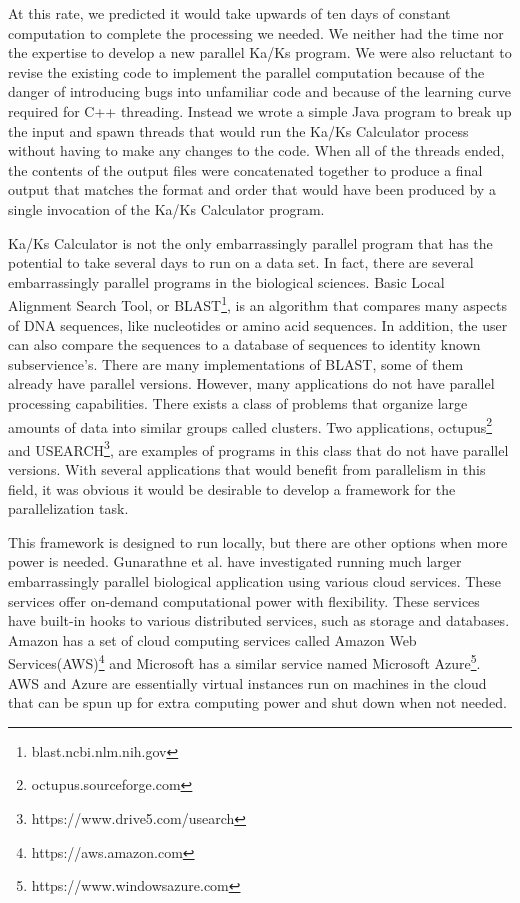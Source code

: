 \documentclass[12pt]{article}
\begin{document}
At this rate, we predicted it would take upwards of ten days of constant
computation to complete the processing we needed. We neither had the time nor
the expertise to develop a new parallel Ka/Ks program. We were also reluctant to
revise the existing code to implement the parallel computation because of the
danger of introducing bugs into unfamiliar code and because of the learning
curve required for C++ threading. Instead we wrote a simple Java program to
break up the input and spawn threads that would run the Ka/Ks Calculator process
without having to make any changes to the code. When all of the threads ended,
the contents of the output files were concatenated together to produce a final
output that matches the format and order that would have been produced by a
single invocation of the Ka/Ks Calculator program.

Ka/Ks Calculator is not the only embarrassingly parallel program that has the
potential to take several days to run on a data set. In fact, there are several
embarrassingly parallel programs in the biological sciences. Basic Local
Alignment Search Tool, or BLAST\footnote{blast.ncbi.nlm.nih.gov}, is an
algorithm that compares many aspects of DNA sequences, like nucleotides or amino
acid sequences. In addition, the user can also compare the sequences to a
database of sequences to identity known subservience's. There are many
implementations of BLAST, some of them already have parallel versions.  However,
many applications do not have parallel processing capabilities. There exists a
class of problems that organize large amounts of data into similar groups called
clusters. Two applications, octupus\footnote{octupus.sourceforge.com} and
USEARCH\footnote{https://www.drive5.com/usearch}, are examples of programs in
this class that do not have parallel versions. With several applications that
would benefit from parallelism in this field, it was obvious it would be
desirable to develop a framework for the parallelization task.

This framework is designed to run locally, but there are other options when more
power is needed. Gunarathne et al.\cite{cloud} have investigated running much
larger embarrassingly parallel biological application using various cloud
services. These services offer on-demand computational power with flexibility.
These services have built-in hooks to various distributed services, such as
storage and databases. Amazon has a set of cloud computing services called
Amazon Web Services(AWS)\footnote{https://aws.amazon.com} and Microsoft has a
similar service named Microsoft Azure\footnote{https://www.windowsazure.com}.
AWS and Azure are essentially virtual instances run on machines in the cloud
that can be spun up for extra computing power and shut down when not needed. 
\end{document}
